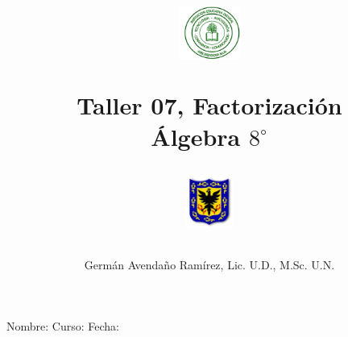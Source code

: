 \documentclass[10pt,twoside]{article}
\author{Germ\'an Avenda\~no Ram\'irez, Lic. U.D., M.Sc. U.N.}
\title{\begin{minipage}{.2\textwidth}
\includegraphics[height=1.75cm]{Images/logo-colegio.png}\end{minipage}
\begin{minipage}{.55\textwidth}
\begin{center}
Taller 07, Factorización  \\
Álgebra $8^{\circ}$
\end{center}
\end{minipage}\hfill
\begin{minipage}{.2\textwidth}
\includegraphics[height=1.75cm]{Images/logo-sed.png} 
\end{minipage}}
\date{}
\begin{document}
\maketitle
Nombre: \hrulefill Curso: \underline{\hspace*{44pt}} Fecha: \underline{\hspace*{2.5cm}}
\end{document}

